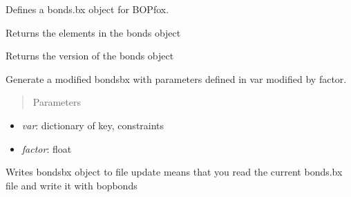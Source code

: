 \documentclass[letterpaper,10pt,english]{sphinxmanual}
\begin{document}
\begin{fulllineitems}
\label{classes:bopmodel.bondsbx}
Defines a bonds.bx object for BOPfox.

\begin{fulllineitems}
\label{classes:bopmodel.bondsbx.get_bond}
Returns the elements in the bonds object

\end{fulllineitems}


\begin{fulllineitems}
\label{classes:bopmodel.bondsbx.get_version}
Returns the version of the bonds object

\end{fulllineitems}


\begin{fulllineitems}
\label{classes:bopmodel.bondsbx.rattle}
Generate a modified bondsbx with parameters defined in var modified 
by factor.
\begin{quote}\begin{description}
\item[{Parameters}] \leavevmode
\end{description}\end{quote}
\begin{itemize}
\item {} 
\emph{var}: dictionary of key, constraints

\item {} 
\emph{factor}: float

\end{itemize}

\end{fulllineitems}


\begin{fulllineitems}
\label{classes:bopmodel.bondsbx.write}
Writes bondsbx object to file
update means that you read the current bonds.bx file
and write it with bopbonds

\end{fulllineitems}


\end{fulllineitems}
\end{document}
